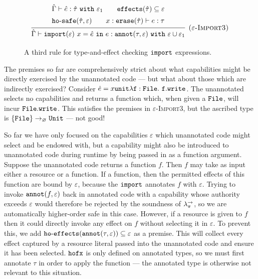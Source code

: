 \begin{figure}[h]

\noindent
{}

\[
\begin{array}{c}

\infer[\textsc{($\varepsilon$-Import3)}]
	{ \hat \Gamma \vdash \kwa{import}(\varepsilon)~x = \hat e~\kw{in} e: \kwa{annot}(\tau, \varepsilon)~\kw{with} \varepsilon \cup \varepsilon_1 }
{{\def\arraystretch{1.4}
  \begin{array}{c}
\hat \Gamma \vdash \hat e: \hat \tau~\kw{with} \varepsilon_1
~~~~~~
\kwa{effects}(\hat \tau) \subseteq \varepsilon \\
\hosafe{\hat \tau}{\varepsilon} ~~~~~~ x: \kwa{erase}(\hat \tau) \vdash e: \tau
  \end{array}}} 
 
\end{array}
\]

\vspace{-7pt}
\caption{A third rule for type-and-effect checking $\mathtt{import}$ expressions.}
\label{fig:import_rule3}
\end{figure}

The premises so far are comprehensively strict about what capabilities might be directly exercised by the unannotated code --- but what about those which are indirectly exercised? Consider $\hat e = {x}{\mathtt{unit}}{\mathtt{\lambda f: { File }.~f.write}}$. The unannotated selects no capabilities and returns a function which, when given a $\mathtt{File}$, will incur $\mathtt{File.write}$. This satisfies the premises in \textsc{$\varepsilon$-Import3}, but the ascribed type is $\{ \mathtt{File} \} \rightarrow_{\varnothing} \mathtt{Unit}$ --- not good!

So far we have only focused on the capabilities $\varepsilon$ which unannotated code might select and be endowed with, but a capability might also be introduced to unannotated code during runtime by being passed in as a function argument. Suppose the unannotated code returns a function $f$. Then $f$ may take as input either a resource or a function. If a function, then the permitted effects of this function are bound by $\varepsilon$, because the $\mathtt{import}$ annotates $f$ with $\varepsilon$. Trying to invoke $\mathtt{annot}(f, \varepsilon)$ back in annotated code with a capability whose authority exceeds $\varepsilon$ would therefore be rejected by the soundness of $\lambda^{\rightarrow}_{\pi}$, so we are automatically higher-order safe in this case. However, if a resource is given to $f$ then it could directly invoke any effect on $f$ without selecting it in $\varepsilon$. To prevent this, we add $\mathtt{ho \hbox{-} effects}(\mathtt{annot}(\tau, \varepsilon)) \subseteq \varepsilon$ as a premise. This will collect every effect captured by a resource literal passed into the unannotated code and ensure it has been selected. $\mathtt{hofx}$ is only defined on annotated types, so we must first annotate $\tau$ in order to apply the function --- the annotated type is otherwise not relevant to this situation.

